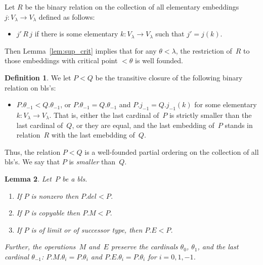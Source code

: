 \documentclass{article}
\newtheorem{lemma}{Lemma}[section]
\theoremstyle{definition}
\newtheorem{definition}[lemma]{Definition}
\theoremstyle{remark}
\DeclareMathOperator{\crit}{crit}
\begin{document}
Let $R$ be the binary relation on the collection of all elementary embeddings $j\colon V_\lambda\to V_\lambda$ defined as follows:
\begin{itemize}
  \item $j'\,R\,j$ if there is some elementary $k\colon V_\lambda\to V_\lambda$ such that $j' = j(k) $.
\end{itemize}
Then Lemma~\ref{lem:sup_crit} implies that for any $\theta<\lambda$, the restriction of~$R$ to those embeddings with critical point $<\theta$ is well founded. 

\begin{definition} \label{def:smaller_bls}
  We let $P<Q$ be the transitive closure of the following binary relation on bls's:
  \begin{itemize}
    \item $P.\theta_{-1}< Q.\theta_{-1}$, or $P.\theta_{-1}= Q.\theta_{-1}$ and $P.{j_{-1}} = Q.j_{-1}(k)$ for some elementary $k\colon V_\lambda\to V_\lambda$. That is, either the last cardinal of~$P$ is strictly smaller than the last cardinal of~$Q$, or they are equal, and the last embedding of~$P$ stands in relation~$R$ with the last emebdding of~$Q$. 
  \end{itemize}
\end{definition}

Thus, the relation $P<Q$ is a well-founded partial ordering on the collection of all bls's. We say that $P$ is \emph{smaller} than~$Q$.   





\begin{lemma} \label{lem:operations_reduce_rank}
  Let~$P$ be a bls. 
  \begin{enumerate}
    \item If $P$ is nonzero then $P.del < P$. 
    \item If $P$ is copyable then $P.M<P$. 
    \item If $P$ is of limit or of successor type, then $P.E<P$.
  \end{enumerate}
  Further, the operations~$M$ and~$E$ preserve the cardinals $\theta_0$, $\theta_1$, and the last cardinal $\theta_{-1}$: $P.M.\theta_i = P.\theta_i$ and $P.E.\theta_i = P.\theta_i$ for $i = 0,1,-1$. 
\end{lemma}
\end{document}
